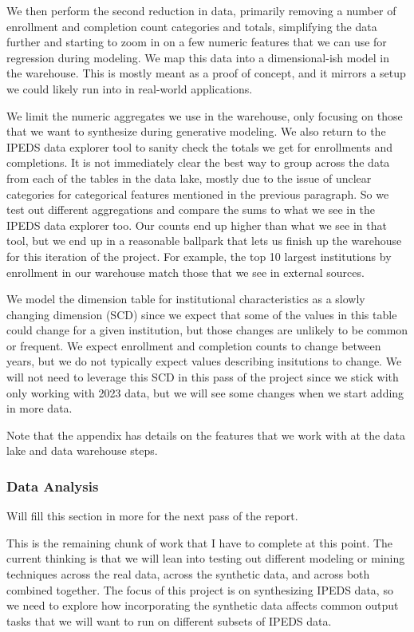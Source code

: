 \documentclass[sigconf, authorversion, nonacm]{acmart}
\begin{document}
        We then perform the second reduction in data, primarily removing a number of enrollment and completion count categories and totals, simplifying the data further and starting to zoom in on a few numeric features that we can use for regression during modeling. We map this data into a dimensional-ish model in the warehouse. This is mostly meant as a proof of concept, and it mirrors a setup we could likely run into in real-world applications.

        We limit the numeric aggregates we use in the warehouse, only focusing on those that we want to synthesize during generative modeling. We also return to the IPEDS data explorer tool to sanity check the totals we get for enrollments and completions. It is not immediately clear the best way to group across the data from each of the tables in the data lake, mostly due to the issue of unclear categories for categorical features mentioned in the previous paragraph. So we test out different aggregations and compare the sums to what we see in the IPEDS data explorer too. Our counts end up higher than what we see in that tool, but we end up in a reasonable ballpark that lets us finish up the warehouse for this iteration of the project. For example, the top 10 largest institutions by enrollment in our warehouse match those that we see in external sources.

        We model the dimension table for institutional characteristics as a slowly changing dimension (SCD) since we expect that some of the values in this table could change for a given institution, but those changes are unlikely to be common or frequent. We expect enrollment and completion counts to change between years, but we do not typically expect values describing insitutions to change. We will not need to leverage this SCD in this pass of the project since we stick with only working with 2023 data, but we will see some changes when we start adding in more data.

        Note that the appendix has details on the features that we work with at the data lake and data warehouse steps.

    \subsubsection{Data Analysis}
        Will fill this section in more for the next pass of the report.

        This is the remaining chunk of work that I have to complete at this point. The current thinking is that we will lean into testing out different modeling or mining techniques across the real data, across the synthetic data, and across both combined together. The focus of this project is on synthesizing IPEDS data, so we need to explore how incorporating the synthetic data affects common output tasks that we will want to run on different subsets of IPEDS data.
\end{document}
